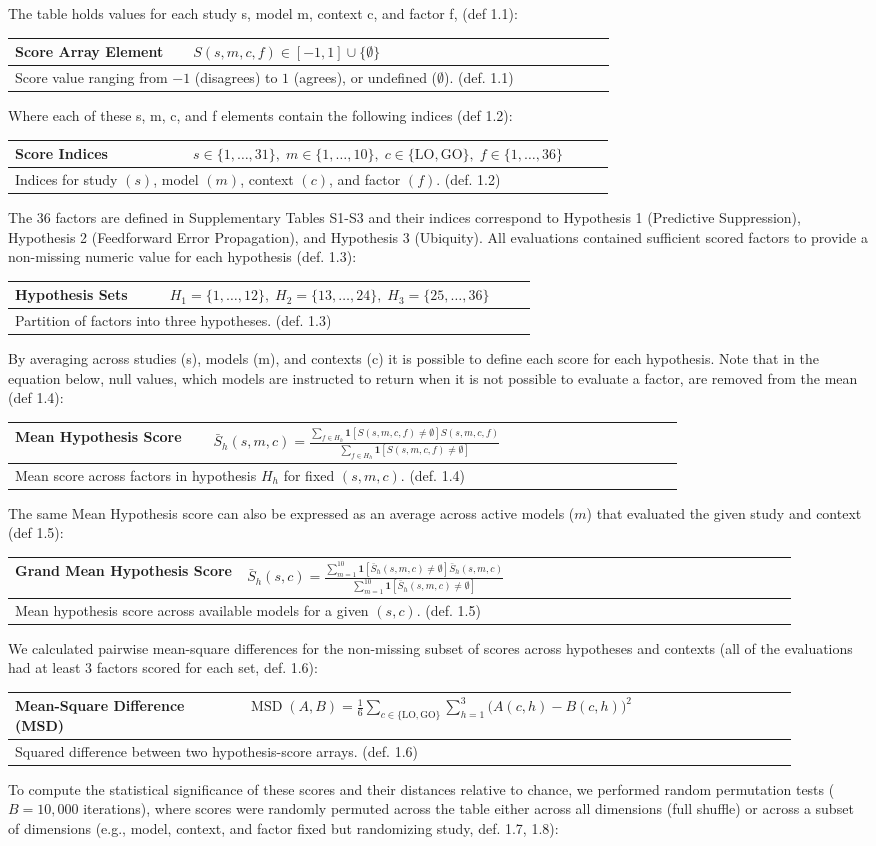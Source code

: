 \documentclass[12pt]{article}
\renewcommand{\arraystretch}{1.06}
\newcommand{\EquationBox}[3]{%
  \begin{center}
  \begingroup
  \small
  \setlength{\tabcolsep}{6pt}%
  \renewcommand{\arraystretch}{1.18}%
  \begin{tabular}{|p{0.27\linewidth}|p{0.64\linewidth}|}
  \hline
  \textbf{#1} & #2 \\
  \hline
  \multicolumn{2}{|p{0.94\linewidth}|}{#3} \\
  \hline
  \end{tabular}
  \endgroup
  \end{center}
}
\begin{document}
The table holds values for each study s, model m, context c, and factor f, (def 1.1):
\EquationBox{Score Array Element}{\(S(s,m,c,f) \in [-1,1]\cup\{\emptyset\}\)}{Score value ranging from \(-1\) (disagrees) to \(1\) (agrees), or undefined (\(\emptyset\)). (def. 1.1)}
Where each of these s, m, c, and f elements contain the following indices (def 1.2):
\EquationBox{Score Indices}{\(s\in\{1,\ldots,31\},\; m\in\{1,\ldots,10\},\; c\in\{\mathrm{LO},\mathrm{GO}\},\; f\in\{1,\ldots,36\}\)}{Indices for study \((s)\), model \((m)\), context \((c)\), and factor \((f)\). (def. 1.2)}
The 36 factors are defined in Supplementary Tables S1-S3 and their indices correspond to Hypothesis 1 (Predictive Suppression), Hypothesis 2 (Feedforward Error Propagation), and Hypothesis 3 (Ubiquity). All evaluations contained sufficient scored factors to provide a non-missing numeric value for each hypothesis (def. 1.3):
\EquationBox{Hypothesis Sets}{\(H_1=\{1,\ldots,12\},\; H_2=\{13,\ldots,24\},\; H_3=\{25,\ldots,36\}\)}{Partition of factors into three hypotheses. (def. 1.3)}
By averaging across studies (s), models (m), and contexts (c) it is possible to define each score for each hypothesis. Note that in the equation below, null values, which models are instructed to return when it is not possible to evaluate a factor, are removed from the mean (def 1.4):
\EquationBox{Mean Hypothesis Score}{\(\displaystyle \bar{S}_h(s,m,c)=\frac{\sum_{f\in H_h}\mathbf{1}[S(s,m,c,f)\ne\emptyset]S(s,m,c,f)}{\sum_{f\in H_h}\mathbf{1}[S(s,m,c,f)\ne\emptyset]}\)}{Mean score across factors in hypothesis \(H_h\) for fixed \((s,m,c)\). (def. 1.4)}
The same Mean Hypothesis score can also be expressed as an average across active models ($m$) that evaluated the given study and context (def 1.5):
\EquationBox{Grand Mean Hypothesis Score}{\(\displaystyle \bar{S}_h(s,c)=\frac{\sum_{m=1}^{10}\mathbf{1}[\bar{S}_h(s,m,c)\ne\emptyset]\bar{S}_h(s,m,c)}{\sum_{m=1}^{10}\mathbf{1}[\bar{S}_h(s,m,c)\ne\emptyset]}\)}{Mean hypothesis score across available models for a given \((s,c)\). (def. 1.5)}
We calculated pairwise mean-square differences for the non-missing subset of scores across hypotheses and contexts (all of the evaluations had at least 3 factors scored for each set, def. 1.6):
\EquationBox{Mean-Square Difference (MSD)}{\(\displaystyle \operatorname{MSD}(A,B)=\frac{1}{6}\sum_{c\in\{\mathrm{LO},\mathrm{GO}\}}\sum_{h=1}^{3}\bigl(A(c,h)-B(c,h)\bigr)^2\)}{Squared difference between two hypothesis-score arrays. (def. 1.6)}
To compute the statistical significance of these scores and their distances relative to chance, we performed random permutation tests ($B = 10{,}000$ iterations), where scores were randomly permuted across the table either across all dimensions (full shuffle) or across a subset of dimensions (e.g., model, context, and factor fixed but randomizing study, def. 1.7, 1.8):
\end{document}
